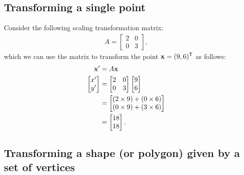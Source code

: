 \documentclass[12pt,letter]{article}
\begin{document}
\subsection{Transforming a single point} 
Consider the following scaling transformation matrix:
\begin{align}
	A = 
	\begin{bmatrix}
		2 & 0 \\
		0 & 3
	\end{bmatrix}, 
\end{align}
which we can use the matrix to transform the point \({\bf x} = (9, 6)^\mathsf{T}\) as follows:
\begin{align}
	{\bf x}^\prime &= A{\bf x}  \notag\\
	\begin{bmatrix}
		x^\prime \\
		y^\prime
	\end{bmatrix}	
 	&=
	\begin{bmatrix}
		2 & 0 \\
		0 & 3
	\end{bmatrix}
	\begin{bmatrix}
		9 \\
		6
	\end{bmatrix}	
 \notag\\
 	&=
	\begin{bmatrix}
		\left(2 \times 9\right) + \left(0   \times 6\right)\\
		  \left(0 \times 9\right) + \left(3 \times 6\right)
	\end{bmatrix} \notag\\
 	&=
	\begin{bmatrix}
		18\\
		18
	\end{bmatrix}.
	\label{scalingExample1}
\end{align}

\subsection{Transforming a shape (or polygon) given
by a set of vertices}
\end{document}
